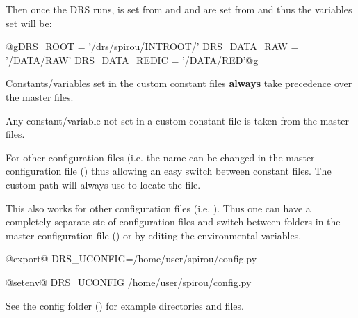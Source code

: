 \vspace{0.5cm}

\noindent Then once the DRS runs,  is set from  and  and  are set from  and thus the variables set will be:
\begin{cmdboxprintspecial}
@gDRS_ROOT = '/drs/spirou/INTROOT/' 
DRS_DATA_RAW = '/DATA/RAW'
DRS_DATA_REDIC = '/DATA/RED'@g
\end{cmdboxprintspecial}

\vspace{0.5cm}

\begin{note}
Constants/variables set in the custom constant files \textbf{always} take precedence over the master files.
\end{note}

\begin{note}
Any constant/variable not set in a custom constant file is taken from the master files.
\end{note}

\begin{note}
For other configuration files (i.e.  the name can be changed in the master configuration file (\configtxtfile) thus allowing an easy switch between constant files. The custom path will always use  to locate the file.
\end{note}

\noindent This also works for other configuration files (i.e. ). Thus one can have a completely separate ste of configuration files and switch between folders in the master configuration file (\configtxtfile) or by editing the environmental variables.

\begin{bashbox}[title={e.g. in $\sim$/.bashrc or $\sim$/.bash\_profile}]
@export@ DRS_UCONFIG=/home/user/spirou/config.py
\end{bashbox}

\begin{cshbox}[title={e.g. in $\sim$/.tcshrc}]
@setenv@ DRS_UCONFIG /home/user/spirou/config.py
\end{cshbox}

See the config folder () for example  directories and files.


